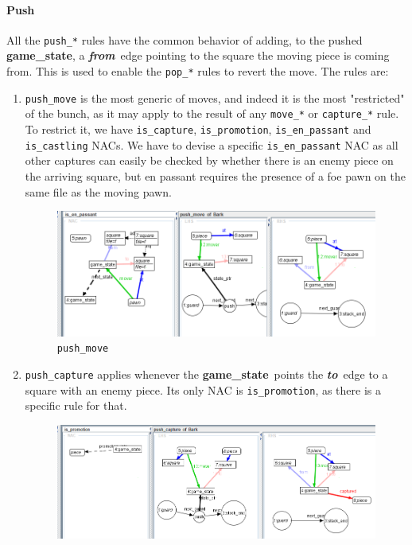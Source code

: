\documentclass[a4paper, 10pt]{scrartcl}
\newcommand{\noderepr}[1]{\textsf{\textbf{#1}}}
\newcommand{\edgerepr}[1]{\textit{\textbf{#1}}}
\newcommand{\gamestate}{\noderepr{game\_state}}
\newcommand{\tosquare}{\edgerepr{to}}
\newcommand{\fromsquare}{\edgerepr{from}}
\begin{document}
    \paragraph*{Push} All the \texttt{push\_*} rules have the common behavior of adding, to the pushed \gamestate, a \fromsquare\ edge pointing to the square the moving piece is coming from. This is used to enable the \texttt{pop\_*} rules to revert the move. The rules are:
    \begin{enumerate}
        \item \texttt{push\_move} is the most generic of moves, and indeed it is the most "restricted" of the bunch, as it may apply to the result of any \texttt{move\_*} or \texttt{capture\_*} rule. To restrict it, we have \texttt{is\_capture}, \texttt{is\_promotion}, \texttt{is\_en\_passant} and \texttt{is\_castling} NACs. We have to devise a specific \texttt{is\_en\_passant} NAC as all other captures can easily be checked by whether there is an enemy piece on the arriving square, but en passant requires the presence of a foe pawn on the same file as the moving pawn.
        \begin{figure}[H]
            \centering
            \includegraphics[width=.8\linewidth]{images/push_move.png}
            \caption{\texttt{push\_move}}
        \end{figure}
        \item \texttt{push\_capture} applies whenever the \gamestate\ points the \tosquare\ edge to a square with an enemy piece. Its only NAC is \texttt{is\_promotion}, as there is a specific rule for that.
        \begin{figure}[H]
            \centering
            \includegraphics[width=.8\linewidth]{images/push_capture.png}

\end{figure}
\end{enumerate}
\end{document}
